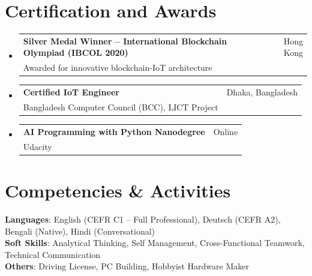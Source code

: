\documentclass[a4paper,11pt]{article}
\makeatletter
\newcommand{\CVSubheading}[4]{
  \vspace{-2pt}\item
    \begin{tabular*}{0.97\textwidth}[t]{l@{\extracolsep{\fill}}r}
      \textbf{#1} & #2 \\
      \small#3 & \small #4 \\
    \end{tabular*}\vspace{-7pt}
}
\newcommand{\CVSubHeadingListStart}{\begin{itemize}[leftmargin=0.5cm, label={}]}
\newcommand{\CVSubHeadingListEnd}{\end{itemize}}
\makeatother
\begin{document}
\section{Certification and Awards}
  \CVSubHeadingListStart
    \CVSubheading
      {Silver Medal Winner -- International Blockchain Olympiad (IBCOL 2020)}{Hong Kong}
      {Awarded for innovative blockchain-IoT architecture}{}
    \CVSubheading
      {Certified IoT Engineer}{Dhaka, Bangladesh}
      {Bangladesh Computer Council (BCC), LICT Project}{}
    \CVSubheading
      {AI Programming with Python Nanodegree}{Online}
      {Udacity}{}
  \CVSubHeadingListEnd

\section{Competencies \& Activities}
 \begin{itemize}[leftmargin=0.5cm, label={}]
    \small{\item{
     \textbf{Languages}{: English (CEFR C1 -- Full Professional), Deutsch (CEFR A2), Bengali (Native), Hindi (Conversational)} \\
     \textbf{Soft Skills}{: Analytical Thinking, Self Management, Cross-Functional Teamwork, Technical Communication} \\
     \textbf{Others}{: Driving License, PC Building, Hobbyist Hardware Maker} \\
    }}
 \end{itemize}
\end{document}
